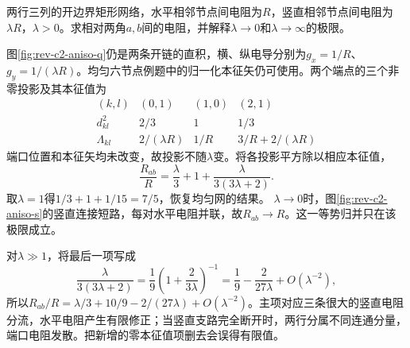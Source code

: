 \begin{exercise}[横纵电阻不同的六节点网]\label{ex:rev-c2-aniso}
两行三列的开边界矩形网络，水平相邻节点间电阻为$R$，竖直相邻节点间电阻为$\lambda R$，$\lambda>0$。求相对两角$a,b$间的电阻，并解释$\lambda\to0$和$\lambda\to\infty$的极限。
\end{exercise}
\begin{solution}
图\ref{fig:rev-c2-aniso-q}仍是两条开链的直积，横、纵电导分别为$g_x=1/R$、$g_y=1/(\lambda R)$。均匀六节点例题中的归一化本征矢仍可使用。两个端点的三个非零投影及其本征值为
\[
\begin{array}{c|ccc}
(k,l)&(0,1)&(1,0)&(2,1)\\\hline
d_{kl}^2&2/3&1&1/3\\
\Lambda_{kl}&2/(\lambda R)&1/R&3/R+2/(\lambda R)
\end{array}
\]
端口位置和本征矢均未改变，故投影不随$\lambda$变。将各投影平方除以相应本征值，
\[
 \boxed{\frac{R_{ab}}R=\frac\lambda3+1+\frac{\lambda}{3(3\lambda+2)}}.
\]
取$\lambda=1$得$1/3+1+1/15=7/5$，恢复均匀网的结果。
$\lambda\to0$时，图\ref{fig:rev-c2-aniso-s}的竖直连接短路，每对水平电阻并联，故$R_{ab}\to R$。这一等势归并只在该极限成立。

对$\lambda\gg1$，将最后一项写成
\[
 \frac{\lambda}{3(3\lambda+2)}
 =\frac19\left(1+\frac{2}{3\lambda}\right)^{-1}
 =\frac19-\frac{2}{27\lambda}+O(\lambda^{-2}),
\]
所以$R_{ab}/R=\lambda/3+10/9-2/(27\lambda)+O(\lambda^{-2})$。主项对应三条很大的竖直电阻分流，水平电阻产生有限修正；当竖直支路完全断开时，两行分属不同连通分量，端口电阻发散。把新增的零本征值项删去会误得有限值。
\end{solution}

